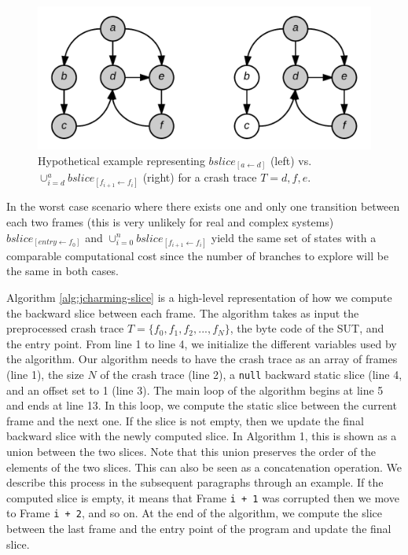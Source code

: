 \documentclass[12pt]{report}
\begin{document}
\begin{figure}
\centering
\includegraphics[scale=0.25]{media/chap8/jcharming-slices.png}
\caption{Hypothetical example representing $bslice_{[a \leftarrow d]}$ (left) vs. $\cup_{i=d}^{a} bslice_{[f_{i+1} \leftarrow f_i]}$ (right) for a crash trace $T={d, f, e}$.
\label{fig:jcharming-slice}}
\end{figure}

In the worst case scenario where there exists one and only one
transition between each two frames (this is very unlikely for real and
complex systems) \(bslice_{[entry \leftarrow f_0]}\) and
\(\cup_{i=0}^n bslice_{[f_{i+1} \leftarrow f_i]}\) yield the same set of
states with a comparable computational cost since the number of branches
to explore will be the same in both cases.

Algorithm \ref{alg:jcharming-slice} is a high-level representation of
how we compute the backward slice between each frame. The algorithm
takes as input the preprocessed crash trace
\(T=\{f_0, f_1, f_2, ..., f_N\}\), the byte code of the SUT, and the
entry point. From line 1 to line 4, we initialize the different
variables used by the algorithm. Our algorithm needs to have the crash
trace as an array of frames (line 1), the size \(N\) of the crash trace
(line 2), a \texttt{null} backward static slice (line 4, and an offset
set to 1 (line 3). The main loop of the algorithm begins at line 5 and
ends at line 13. In this loop, we compute the static slice between the
current frame and the next one. If the slice is not empty, then we
update the final backward slice with the newly computed slice. In
Algorithm 1, this is shown as a union between the two slices. Note that
this union preserves the order of the elements of the two slices. This
can also be seen as a concatenation operation. We describe this process
in the subsequent paragraphs through an example. If the computed slice
is empty, it means that Frame \lstinline!i + 1! was corrupted then we
move to Frame \lstinline!i + 2!, and so on. At the end of the algorithm,
we compute the slice between the last frame and the entry point of the
program and update the final slice.
\end{document}

